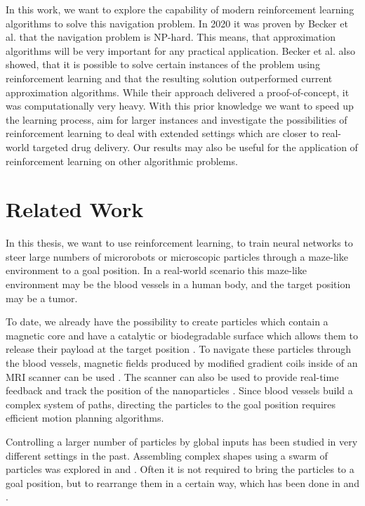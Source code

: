  In this work, we want to explore the capability of modern reinforcement learning algorithms to solve this navigation problem. In 2020 it was proven by Becker et al. \cite{becker2020} that the navigation problem is NP-hard. This means, that approximation algorithms will be very important for any practical application. Becker et al. also showed, that it is possible to solve certain instances of the problem using reinforcement learning and that the resulting solution outperformed current approximation algorithms. While their approach delivered a proof-of-concept, it was computationally very heavy. With this prior knowledge we want to speed up the learning process, aim for larger instances and investigate the possibilities of reinforcement learning to deal with extended settings which are closer to real-world targeted drug delivery. Our results may also be useful for the application of reinforcement learning on other algorithmic problems.

\section{Related Work} \label{sec:RelatedWork}
In this thesis, we want to use reinforcement learning, to train neural networks to steer large numbers of microrobots or microscopic particles through a maze-like environment to a goal position. In a real-world scenario this maze-like environment may be the blood vessels in a human body, and the target position may be a tumor. 

To date, we already have the possibility to create particles which contain a magnetic core and have a catalytic or biodegradable surface which allows them to release their payload at the target position \cite{litvinov2012high, mellal2015magnetic}. To navigate these particles through the blood vessels, magnetic fields produced by modified gradient coils inside of an MRI scanner can be used \cite{mathieu2007magnetic, mathieu2010steering}. The scanner can also be used to provide real-time feedback and track the position of the nanoparticles \cite{pouponneau2009magnetic}. Since blood vessels build a complex system of paths, directing the particles to the goal position requires efficient motion planning algorithms. 

Controlling a larger number of particles by global inputs has been studied in very different settings in the past. Assembling complex shapes using a swarm of particles was explored in \cite{becker2018tilt} and \cite{balanza2019full}. Often it is not required to bring the particles to a goal position, but to rearrange them in a certain way, which has been done in \cite{becker2013massive} and \cite{zhang2017rearranging}. 

